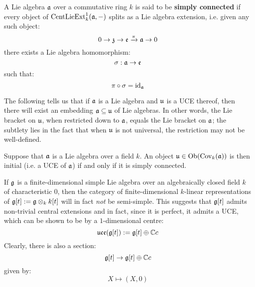         \begin{definition} \label{def: simply_connected_lie_algebras}
            A Lie algebra $\mathfrak{a}$ over a commutative ring $k$ is said to be \textbf{simply connected} if every object of $\mathrm{Cent}\mathrm{Lie}\mathrm{Ext}^1_k(\mathfrak{a}, -)$ splits as a Lie algebra extension, i.e. given any such object:
                $$0 \to \mathfrak{z} \to \mathfrak{e} \xrightarrow[]{\pi} \mathfrak{a} \to 0$$
            there exists a Lie algebra homomorphism:
                $$\sigma: \mathfrak{a} \to \mathfrak{e}$$
            such that:
                $$\pi \circ \sigma = \mathrm{id}_{\mathfrak{a}}$$
        \end{definition}
        The following tells us that if $\mathfrak{a}$ is a Lie algebra and $\mathfrak{u}$ is a UCE thereof, then there will exist an embedding $\mathfrak{a} \subseteq \mathfrak{u}$ of Lie algebras. In other words, the Lie bracket on $\mathfrak{u}$, when restricted down to $\mathfrak{a}$, equals the Lie bracket on $\mathfrak{a}$; the subtlety lies in the fact that when $\mathfrak{u}$ is not universal, the restriction may not be well-defined. 
        \begin{proposition} \label{prop: UCEs_are_simply_connected}
            \cite[Theorem 1.16]{garland_arithmetics_of_loop_groups} Suppose that $\mathfrak{a}$ is a Lie algebra over a field $k$. An object $\mathfrak{u} \in \mathrm{Ob}( \mathrm{Cov}_k(\mathfrak{a}) )$ is then initial (i.e. a UCE of $\mathfrak{a}$) if and only if it is simply connected.
        \end{proposition}
        \begin{example}
            If $\mathfrak{g}$ is a finite-dimensional simple Lie algebra over an algebraically closed field $k$ of characteristic $0$, then the category of finite-dimensional $k$-linear representations of $\g[t] := \g \tensor_k k[t]$ will in fact \textit{not} be semi-simple. This suggests that $\mathfrak{g}[t]$ admits non-trivial central extensions and in fact, since it is perfect, it admits a UCE, which can be shown to be by a $1$-dimensional centre:
                $$\mathfrak{uce}(\mathfrak{g}[t]) := \mathfrak{g}[t] \oplus \mathbb{C} c$$
            Clearly, there is also a section:
                $$\mathfrak{g}[t] \to \mathfrak{g}[t] \oplus \mathbb{C} c$$
            given by:
                $$X \mapsto (X, 0)$$
        \end{example}